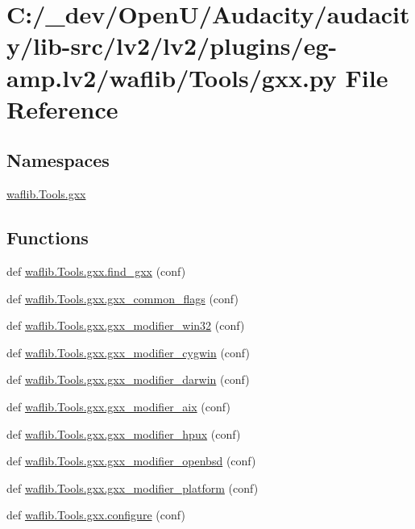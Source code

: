 \hypertarget{lv2_2plugins_2eg-amp_8lv2_2waflib_2_tools_2gxx_8py}{}\section{C\+:/\+\_\+dev/\+Open\+U/\+Audacity/audacity/lib-\/src/lv2/lv2/plugins/eg-\/amp.lv2/waflib/\+Tools/gxx.py File Reference}
\label{lv2_2plugins_2eg-amp_8lv2_2waflib_2_tools_2gxx_8py}
\subsection*{Namespaces}
\begin{DoxyCompactItemize}
\item 
 \hyperlink{namespacewaflib_1_1_tools_1_1gxx}{waflib.\+Tools.\+gxx}
\end{DoxyCompactItemize}
\subsection*{Functions}
\begin{DoxyCompactItemize}
\item 
def \hyperlink{namespacewaflib_1_1_tools_1_1gxx_a429b712dd222e6e975da527c68c08ba8}{waflib.\+Tools.\+gxx.\+find\+\_\+gxx} (conf)
\item 
def \hyperlink{namespacewaflib_1_1_tools_1_1gxx_a86410b2f6bcf01791c43e27ddebf3080}{waflib.\+Tools.\+gxx.\+gxx\+\_\+common\+\_\+flags} (conf)
\item 
def \hyperlink{namespacewaflib_1_1_tools_1_1gxx_a5161aa30bcb691ffeb6b39da4b9b2b62}{waflib.\+Tools.\+gxx.\+gxx\+\_\+modifier\+\_\+win32} (conf)
\item 
def \hyperlink{namespacewaflib_1_1_tools_1_1gxx_a70609bea69338d82affec21284c6c5dc}{waflib.\+Tools.\+gxx.\+gxx\+\_\+modifier\+\_\+cygwin} (conf)
\item 
def \hyperlink{namespacewaflib_1_1_tools_1_1gxx_afb73b72b4db84fa412549484f754901e}{waflib.\+Tools.\+gxx.\+gxx\+\_\+modifier\+\_\+darwin} (conf)
\item 
def \hyperlink{namespacewaflib_1_1_tools_1_1gxx_aae0a6b0cc6273670e94d02a1601481ca}{waflib.\+Tools.\+gxx.\+gxx\+\_\+modifier\+\_\+aix} (conf)
\item 
def \hyperlink{namespacewaflib_1_1_tools_1_1gxx_a5862cdb93d3572914361f8f6261e8a18}{waflib.\+Tools.\+gxx.\+gxx\+\_\+modifier\+\_\+hpux} (conf)
\item 
def \hyperlink{namespacewaflib_1_1_tools_1_1gxx_a6915c3fe47d85e1eca7787adfc24e570}{waflib.\+Tools.\+gxx.\+gxx\+\_\+modifier\+\_\+openbsd} (conf)
\item 
def \hyperlink{namespacewaflib_1_1_tools_1_1gxx_a8ac4de3cf5a92e00e8c75e1272521afa}{waflib.\+Tools.\+gxx.\+gxx\+\_\+modifier\+\_\+platform} (conf)
\item 
def \hyperlink{namespacewaflib_1_1_tools_1_1gxx_aaf1ce44a59356fa376d25557d760bf6a}{waflib.\+Tools.\+gxx.\+configure} (conf)
\end{DoxyCompactItemize}

